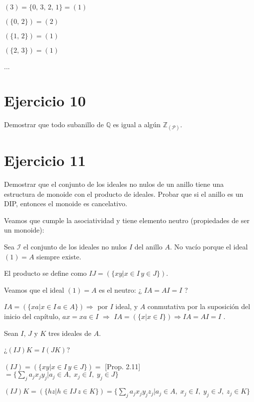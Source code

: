 \documentclass[10pt,a4paper]{article}
\begin{document}
	$(3) = \{ 0,\, 3,\, 2,\, 1 \} = (1) $
	
	$(\{0,\, 2 \}) = (2)$
	
	$(\{1,\, 2 \}) = (1)$
	
	$(\{2,\, 3 \}) = (1)$
	
	...
	
	
	
	\section*{Ejercicio 10}
	
	
	Demostrar que todo subanillo de $\mathbb{Q} $ es igual a algún $ \mathbb{Z}_{\left( \mathcal{P} \right)} $.
	
	\hfill
	
	
	
	
	\section*{Ejercicio 11}
	
	Demostrar que el conjunto de los ideales no nulos de un anillo tiene una estructura de monoide con el producto de ideales. Probar que si el anillo es un DIP, entonces el monoide es cancelativo.
	
	\hfill
	
	
	Veamos que cumple la asociatividad y tiene elemento neutro (propiedades de ser un monoide):
	
	Sea $\mathcal{I}$ el conjunto de los ideales no nulos $I$ del anillo $A$. No vacío porque el ideal $(1) = A$ siempre existe.
	
	El producto se define como $ IJ = \left( \{ xy \vert x\in I \, y \in J \} \right)  $.
	
	Veamos que el ideal $(1) = A $ es el neutro: ¿ $I A = AI = I $ ?
	
	$ IA = \left( \{ xa \vert x\in I \, a \in A \} \right)  \Rightarrow  $ por $I$ ideal, y $A$ conmutativa por la suposición del inicio del capítulo, $ax = xa \in I$ $ \Rightarrow $ $ IA =  \left( \{ x \vert x\in I \} \right) \Rightarrow IA = AI = I$ .
	
	Sean $I$, $J$ y $K$ tres ideales de $A$.
	
	¿$(IJ)K = I(JK)$?
	
	$(IJ) =  \left( \{ xy \vert x\in I \, y \in J \} \right)  = $ [Prop. 2.11] $ = \{ \sum_j a_j x_j y_j \vert a_j \in A, \; x_j \in I, \; y_j \in J \}$
	
	$(IJ)K =  \left( \{ hz \vert h\in IJ \, z \in K \} \right) =  \{ \sum_j a_j x_j y_j z_j \vert a_j \in A, \; x_j \in I, \; y_j \in J, \; z_j \in K \} $ 
	
\end{document}
